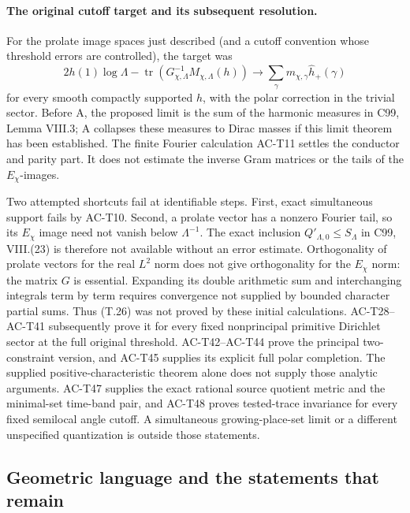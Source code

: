 \paragraph{The original cutoff target and its subsequent resolution.}
For the prolate image spaces just described
(and a cutoff convention whose threshold errors
are controlled), the target was
\[
 2h(1)\log\Lambda
 -\operatorname{tr}(G_{\chi,\Lambda}^{-1}M_{\chi,\Lambda}(h))
 \longrightarrow
 \sum_\gamma m_{\chi,\gamma}\widehat h_+(\gamma)               \tag{T.26}
\]
for every smooth compactly supported \(h\),
with the polar correction in the trivial
sector. Before A, the proposed limit is the
sum of the harmonic measures in C99,
Lemma VIII.3; A collapses these measures to
Dirac masses if this limit theorem has been
established. The finite Fourier calculation
AC-T11 settles the conductor and parity
part. It does not estimate the inverse Gram
matrices or the tails of the \(E_\chi\)-images.

Two attempted shortcuts fail at identifiable
steps. First, exact simultaneous support
fails by AC-T10. Second, a prolate vector
has a nonzero Fourier tail, so its \(E_\chi\)
image need not vanish below \(\Lambda^{-1}\).
The exact inclusion \(Q'_{\Lambda,0}\leq
S_\Lambda\) in C99, VIII.(23) is therefore
not available without an error estimate.
Orthogonality of prolate vectors for the
real \(L^2\) norm does not give orthogonality
for the \(E_\chi\) norm: the matrix \(G\)
is essential. Expanding its double arithmetic
sum and interchanging integrals term by
term requires convergence not supplied by
bounded character partial sums. Thus
(T.26) was not proved by these initial calculations.
AC-T28--AC-T41 subsequently prove it for every
fixed nonprincipal primitive Dirichlet sector at
the full original threshold.  AC-T42--AC-T44
prove the principal two-constraint version, and
AC-T45 supplies its explicit full polar completion.
The supplied positive-characteristic theorem alone
does not supply those analytic arguments.
AC-T47 supplies the exact rational source quotient metric
and the minimal-set time-band pair, and AC-T48 proves
tested-trace invariance for every fixed semilocal angle
cutoff.  A simultaneous growing-place-set limit or a
different unspecified quantization is outside those
statements.

\subsection{Geometric language and the statements that remain}

